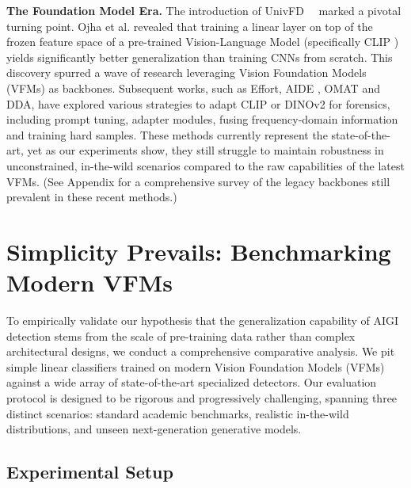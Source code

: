 \documentclass[sigconf,screen]{acmart}
\theoremstyle{plain}
\theoremstyle{definition}
\theoremstyle{remark}
\begin{document}
\textbf{The Foundation Model Era.}
The introduction of UnivFD~~\cite{ojha2023towards} marked a pivotal turning point. Ojha et al. revealed that training a linear layer on top of the frozen feature space of a pre-trained Vision-Language Model (specifically CLIP \cite{radford2021learning}) yields significantly better generalization than training CNNs from scratch. This discovery spurred a wave of research leveraging Vision Foundation Models (VFMs) as backbones. Subsequent works, such as Effort\cite{yan2024orthogonal}, AIDE \cite{yan2024sanity}, OMAT\cite{zhou2025breaking} and DDA\cite{chen2025dual}, have explored various strategies to adapt CLIP or DINOv2 \cite{oquab2023dinov2} for forensics, including prompt tuning, adapter modules, fusing frequency-domain information and training hard samples. These methods currently represent the state-of-the-art, yet as our experiments show, they still struggle to maintain robustness in unconstrained, in-the-wild scenarios compared to the raw capabilities of the latest VFMs. (See Appendix for a comprehensive survey of the legacy backbones still prevalent in these recent methods.)


\section{Simplicity Prevails: Benchmarking Modern VFMs}
To empirically validate our hypothesis that the generalization capability of AIGI detection stems from the scale of pre-training data rather than complex architectural designs, we conduct a comprehensive comparative analysis. We pit simple linear classifiers trained on modern Vision Foundation Models (VFMs) against a wide array of state-of-the-art specialized detectors. Our evaluation protocol is designed to be rigorous and progressively challenging, spanning three distinct scenarios: standard academic benchmarks, realistic in-the-wild distributions, and unseen next-generation generative models.

\subsection{Experimental Setup}
\label{sec:setup}
\end{document}
